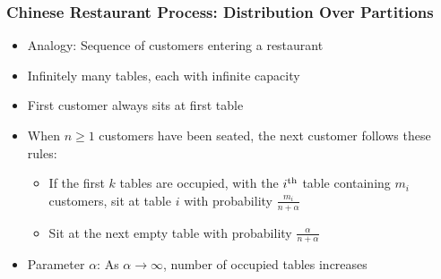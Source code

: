 \begin{frame}
\frametitle{Chinese Restaurant Process: Distribution Over Partitions}
\begin{itemize}[<+->]
\item Analogy: Sequence of customers entering a restaurant
\item Infinitely many tables, each with infinite capacity
\item First customer always sits at first table
\item When $n \geq 1$ customers have been seated, the next customer follows these rules:
    \begin{itemize}
    \item If the first $k$ tables are occupied, with the $i^{\text{th}}$ table containing $m_i$ customers, sit at table $i$ with probability $\frac{m_i}{n+\alpha}$
    \item Sit at the next empty table with probability $\frac{\alpha}{n + \alpha}$
    \end{itemize}
\item Parameter $\alpha$: As $\alpha \to \infty$, number of occupied tables increases
\end{itemize}
\end{frame}

